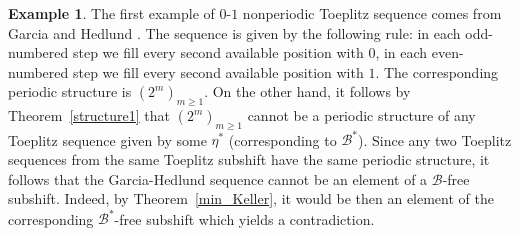 \documentclass[leqno,a4paper,12pt]{article}
\DeclareMathOperator{\lcm}{lcm}
\theoremstyle{definition}
\newtheorem{Example}[Th]{Example}
\newcommand{\sB}{\mathscr{B}}
\begin{document}
\begin{Example}
The first example of $0$-$1$ nonperiodic Toeplitz sequence comes from Garcia and Hedlund \cite{MR0074810}. The sequence is given by the following rule: in each odd-numbered step we fill every second available
position with $0$, in each even-numbered step we fill every second available position
with $1$. The corresponding periodic structure
is $(2^m)_{m\geq1}$. On the other hand, it follows by Theorem~\ref{structure1} that $(2^m)_{m\geq1}$ cannot be a periodic structure of any Toeplitz sequence given by some $\eta^*$ (corresponding to $\sB^*$). Since any two Toeplitz sequences from the same Toeplitz subshift have the same periodic structure, it follows that the Garcia-Hedlund sequence cannot be an element of a $\sB$-free subshift. Indeed, by Theorem~\ref{min_Keller}, it would be then an element of the corresponding $\sB^*$-free subshift which yields a contradiction.
%
\end{Example}
\end{document}
